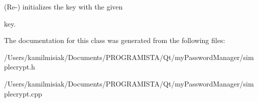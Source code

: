 (Re-\/) initializes the key with the given \begin{DoxyItemize}
\item key. \end{DoxyItemize}


The documentation for this class was generated from the following files\+:\begin{DoxyCompactItemize}
\item 
/\+Users/kamilmisiak/\+Documents/\+P\+R\+O\+G\+R\+A\+M\+I\+S\+T\+A/\+Qt/my\+Password\+Manager/simplecrypt.\+h\item 
/\+Users/kamilmisiak/\+Documents/\+P\+R\+O\+G\+R\+A\+M\+I\+S\+T\+A/\+Qt/my\+Password\+Manager/simplecrypt.\+cpp\end{DoxyCompactItemize}
